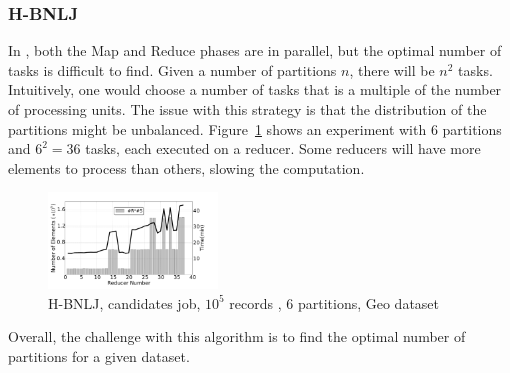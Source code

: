 \subsubsection{H-BNLJ}
In \HBNLJ, both the Map and Reduce phases are in parallel, but the optimal number of tasks is difficult to 
find. Given a number of partitions $n$, there will be $n^2$ tasks. Intuitively, one would choose a number of 
tasks that is a multiple of the number of processing 
units. The issue with this strategy is that the distribution of the partitions might be unbalanced.
Figure~\ref{fig:lb_hbnlj}
shows an experiment with $6$ partitions and $6^2=36$ tasks, each executed on a reducer. Some reducers will have more elements to process than others, 
slowing the computation.
\begin{figure}[!h]
\centering
   \includegraphics[width=0.4\textwidth]{img-perf/perso/loadbalancing/hbnlj.pdf}
   \caption{H-BNLJ, candidates job, $10^{5}$ records \label{fig:lb_hbnlj}, 6 partitions, Geo dataset}
\end{figure}%

Overall, the challenge with this algorithm is to find the optimal number of partitions for a given dataset. 

